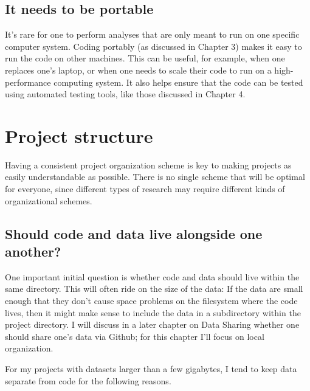 \subsection{It needs to be portable}

It's rare for one to perform analyses that are only meant to run on one specific computer system.  Coding portably (as discussed in Chapter 3) makes it easy to run the code on other machines.  This can be useful, for example, when one replaces one's laptop, or when one needs to scale their code to run on a high-performance computing system.  It also helps ensure that the code can be tested using automated testing tools, like those discussed in Chapter 4.

\section{Project structure}

Having a consistent project organization scheme is key to making projects as easily understandable as possible.  There is no single scheme that will be optimal for everyone, since different types of research may require different kinds of organizational schemes.

\subsection{Should code and data live alongside one another?}

One important initial question is whether code and data should live within the same directory.  This will often ride on the size of the data: If the data are small enough that they don't cause space problems on the filesystem where the code lives, then it might make sense to include the data in a subdirectory within the project directory. I will discuss in a later chapter on Data Sharing whether one should share one's data via Github; for this chapter I'll focus on local organization.

For my projects with datasets larger than a few gigabytes, I tend to keep data separate from code for the following reasons.

